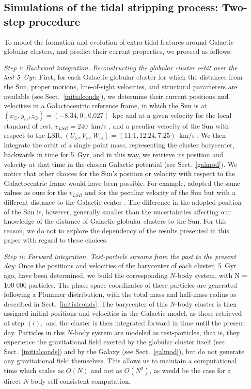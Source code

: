     \subsection{Simulations of the tidal stripping process:  Two-step procedure}\label{numerical}
        To model the formation and evolution of extra-tidal features around Galactic globular clusters, and predict their current properties, we proceed as follows: 

        \textit{Step i: Backward integration. Reconstructing the globular cluster orbit over the last 5~Gyr}: First, for each Galactic globular cluster for which the distances from the Sun, proper motions, line-of-sight velocities, and structural parameters are  available (see Sect.~\ref{initialconds}), we determine their current positions and velocities in a Galactocentric reference frame, in which the Sun is at $(x_\odot, y_\odot, z_\odot) = (-8.34, 0., 0.027)$~kpc \citep{2001ApJ...553..184C, 2014ApJ...783..130R} and at a given velocity for the local standard of rest, $v_{LSR}= 240$~km/s \citep{2014ApJ...783..130R}, and a peculiar velocity of the Sun with respect to the LSR, $(U_{\odot}, V_{\odot}, W_{\odot})  = (11.1, 12.24, 7.25)$~km/s \citep{2010MNRAS.403.1829S}. We then integrate the orbit of a single point mass, representing the cluster barycenter, backwards in time for 5~Gyr, and in this way, we retrieve its position and velocity at that time in the chosen Galactic potential (see Sect.~\ref{galmod}). We notice that other choices for the Sun's position or velocity with respect to the Galactocentric frame would have been possible. For example, \citet{2021MNRAS.505.3033P} adopted the same values as ours for the $v_{LSR}$ and for the peculiar velocity of the Sun but with a different distance to the Galactic center \citep[8.1~kpc in their work, see][]{2018A&A...615L..15G}. The difference in the adopted position of the Sun is, however, generally smaller than the uncertainties affecting our knowledge of the distance of Galactic globular clusters to the Sun. For this reason, we do not to explore the dependency of the results presented in this paper with regard to these choices. 

        \textit{Step ii: Forward integration. Test-particle streams from the past to the present day}: Once the positions and velocities of the barycenter of each cluster, 5~Gyr ago, have been determined, we build  the corresponding $N$-body system, with N = 100 000 particles.  The phase-space coordinates of these particles are generated following a Plummer distribution, with the total mass and half-mass radius as described in Sect.~\ref{initialconds}. The barycenter of this $N$-body cluster is then assigned initial positions and velocities in the Galactic model, as those retrieved at step $(i),$ and the cluster is then integrated forward in time until the present day. Particles in this $N$-body system are modeled as test-particles, that is, they experience the gravitational field exerted by the globular cluster itself (see Sect.~\ref{initialconds}) and by the Galaxy (see Sect.~\ref{galmod}), but do not generate any gravitational field themselves. This allows us to maintain a computational time which scales as $O(N)$ and not as $O(N^2)$, as would be the case for a direct $N$-body self-consistent computation.

